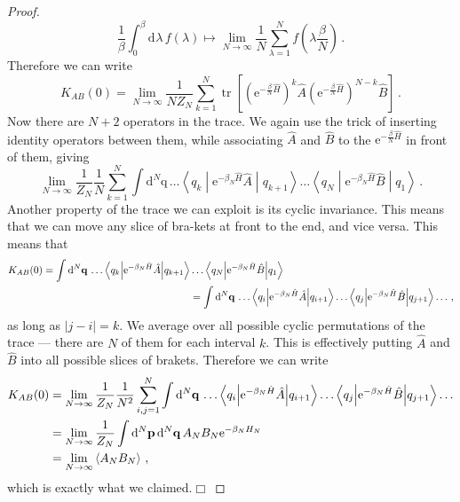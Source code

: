 \documentclass{article}
\theoremstyle{plain}\theoremheaderfont{\normalfont\itshape}\theorembodyfont{\rmfamily}\theoremseparator{.}\newtheorem*{rem}{Remark}\newtheorem*{ex}{Example}\newtheorem*{proof}{Proof}\newtheorem*{altp}{Alternative proof}
\theoremstyle{plain}\theoremheaderfont{\normalfont\bfseries}\theorembodyfont{\rmfamily}\theoremseparator{.}\newtheorem{thm}{Theorem}[section]\newtheorem{lem}[thm]{Lemma}\newtheorem{prop}[thm]{Proposition}\newtheorem*{cor}{Corollary}\newtheorem{defn}[thm]{Definition}\newtheorem{clm}[thm]{Claim}\newtheorem{clminproof}{Claim}
\theoremstyle{break}\theoremheaderfont{\normalfont\itshape}\theorembodyfont{\rmfamily}\theoremseparator{.\medskip}\newtheorem*{proofskip}{Proof}\newtheorem*{exs}{Examples}\newtheorem*{rems}{Remarks}
\theoremstyle{break}\theoremheaderfont{\normalfont\bfseries}\theorembodyfont{\rmfamily}\theoremseparator{.\medskip}\newtheorem{lemskip}[thm]{Lemma}\newtheorem{defnskip}[thm]{Definition}\newtheorem{propskip}[thm]{Proposition}\newtheorem{thmskip}[thm]{Theorem}
\numberwithin{equation}{section}
\newcommand{\qed}{\hfill\ensuremath{\Box}}
\newcommand{\ee}{\mathrm{e}}
\newcommand{\dd}[2][]{\mathrm{d}^{#1} #2\,}
\newcommand{\mel}[3]{\left\langle #1 \middle| #2 \middle| #3 \right\rangle}
\newcommand{\eval}[1]{\left\langle #1 \right\rangle}
\newcommand{\vb}[1]{\bm{\mathrm{#1}}}
\newcommand{\abs}[1]{\left| #1 \right|}
\DeclareMathOperator{\tr}{tr}
\begin{document}
\begin{proof}
        \begin{equation}
            \frac{1}{\beta}\int_{0}^{\beta}\dd{\lambda}f(\lambda)\longmapsto \lim_{N\to\infty}\frac{1}{N}\sum_{\lambda=1}^{N}f\left(\lambda\frac{\beta}{N}\right)\,.
        \end{equation}
        Therefore we can write
        \begin{equation}
            K_{AB}(0)=\lim_{N\to\infty}\frac{1}{N Z_N}\sum_{k=1}^{N}\tr\left[\left(\ee^{-\frac{\beta}{N}\hat{H}}\right)^{k}\hat{A}\left(\ee^{-\frac{\beta}{N}\hat{H}}\right)^{N-k}\hat{B}\right]\,.
        \end{equation}
        Now there are \(N+2\) operators in the trace. We again use the trick of inserting identity operators between them, while associating \(\hat{A}\) and \(\hat{B}\) to the \(\ee^{-\frac{\beta}{N}\hat{H}}\) in front of them, giving
        \begin{equation}
            \lim_{N\to\infty}\frac{1}{Z_N}\frac{1}{N}\sum_{k=1}^{N}\int\dd[N]{\vb{q}}\dots\mel{q_k}{\ee^{-\beta_N \hat{H}}\hat{A}}{q_{k+1}}\dots\mel{q_N}{\ee^{-\beta_N\hat{H}}\hat{B}}{q_1}\,.
        \end{equation}
        Another property of the trace we can exploit is its cyclic invariance. This means that we can move any slice of bra-kets at front to the end, and vice versa. This means that
        \begin{align}
            K_{AB}(0)=\int\dd[N]{\vb{q}}\dots\mel{q_k}{\ee^{-\beta_N \hat{H}}\hat{A}}{q_{k+1}}&\dots\mel{q_N}{\ee^{-\beta_N\hat{H}}\hat{B}}{q_1}\notag\\
            &=\int\dd[N]{\vb{q}}\dots\mel{q_i}{\ee^{-\beta_N \hat{H}}\hat{A}}{q_{i+1}}\dots\mel{q_{j}}{\ee^{-\beta_N\hat{H}}\hat{B}}{q_{j+1}}\dots\,,
        \end{align}
        as long as \(\abs{j-i}=k\). We average over all possible cyclic permutations of the trace --- there are \(N\) of them for each interval \(k\). This is effectively putting \(\hat{A}\) and \(\hat{B}\) into all possible slices of brakets. Therefore we can write
        \begin{align}
            K_{AB}(0)&=\lim_{N\to\infty}\frac{1}{Z_N}\frac{1}{N^2}\sum_{i,j=1}^{N}\int\dd[N]{\vb{q}}\dots\mel{q_i}{\ee^{-\beta_N \hat{H}}\hat{A}}{q_{i+1}}\dots\mel{q_j}{\ee^{-\beta_N\hat{H}}\hat{B}}{q_{j+1}}\dots\notag\\
            &=\lim_{N\to\infty}\frac{1}{Z_N}\int\dd[N]{\vb{p}}\dd[N]{\vb{q}}A_N B_N \ee^{-\beta_N H_N}\notag\\
            &=\lim_{N\to\infty}\eval{A_N B_N}\,,
        \end{align}
        which is exactly what we claimed.\qed


    \end{proof}
\end{document}
